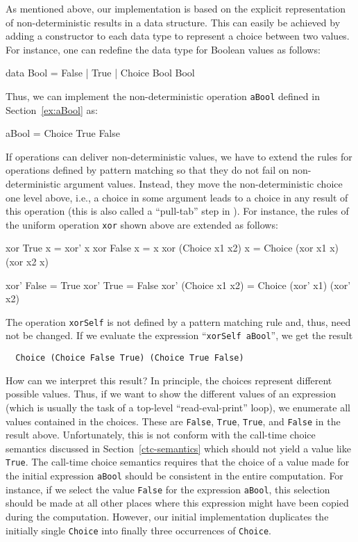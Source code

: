 \documentclass{llncs}
\newcommand{\code}[1]{\mbox{\small\texttt{#1}}}
\newcommand{\ccode}[1]{``\code{#1}''}
\begin{document}
As mentioned above, our implementation is based on the explicit
representation of non-deterministic results in a data structure.
This can easily be achieved by adding a constructor
to each data type to represent a choice between two values.
For instance, one can redefine the data type for Boolean values
as follows:
\begin{haskell}
  data Bool = False | True | Choice Bool Bool
\end{haskell}
Thus, we can implement the non-deterministic operation \code{aBool}
defined in Section~\ref{ex:aBool} as:
\begin{haskell}
  aBool = Choice True False
\end{haskell}
If operations can deliver non-deterministic values,
we have to extend the rules for operations defined by
pattern matching so that they do not fail on non-deterministic argument
values. Instead, they move the non-deterministic choice one level above,
i.e., a choice in some argument leads to a choice in any result
of this operation (this is also called a ``pull-tab'' step in
\cite{AlqaddoumiAntoyFischerReck10}). For instance,
the rules of the uniform operation \code{xor} shown above
are extended as follows:
%
\begin{curry}
  xor True           x = xor' x
  xor False          x = x
  xor (Choice x1 x2) x = Choice (xor x1 x) (xor x2 x)

  xor' False          = True
  xor' True           = False
  xor' (Choice x1 x2) = Choice (xor' x1) (xor' x2)
\end{curry}
%
The operation \code{xorSelf} is not defined by a pattern matching rule
and, thus, need not be changed.
If we evaluate the expression \ccode{xorSelf aBool}, we get the result
\begin{lstlisting}
  Choice (Choice False True) (Choice True False)
\end{lstlisting}
How can we interpret this result?
In principle, the choices represent different possible values.
Thus, if we want to show the different values of an expression
(which is usually the task of a top-level ``read-eval-print'' loop),
we enumerate all values contained in the choices.
These are \code{False}, \code{True}, \code{True}, and \code{False}
in the result above.
Unfortunately, this is not conform with the call-time choice semantics
discussed in Section~\ref{ctc-semantics} which should not yield
a value like \code{True}.
The call-time choice semantics requires that the choice
of a value made for
the initial expression \code{aBool} should be consistent
in the entire computation.
For instance, if we select the value \code{False} for the
expression \code{aBool}, this selection should be made
at all other places where this expression might have been copied
during the computation. However, our initial implementation
duplicates the initially single \code{Choice} into finally three
occurrences of \code{Choice}.
\end{document}
